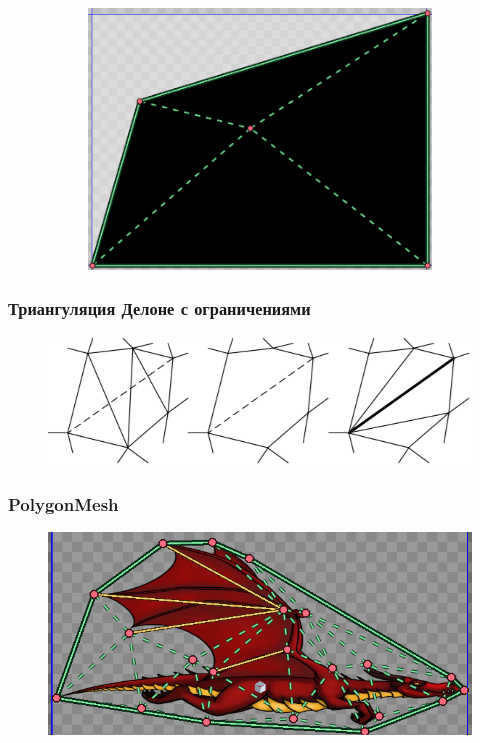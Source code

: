 \documentclass[10pt, unicode]{beamer}
\begin{document}
\begin{frame}
\begin{figure}[H]
\begin{subfigure}{0.49\linewidth}
                \centering
                \includegraphics[scale=0.225]{DeleteBoundary3.png}
            \end{subfigure}
        \end{figure}
    \end{frame}
    \begin{frame}
        \frametitle{Триангуляция Делоне с ограничениями}
        \begin{figure}[H]
            \centering
            \includegraphics[width=\linewidth, keepaspectratio]{DestroyAndBuild.png}
        \end{figure}
    \end{frame}
    \begin{frame}
        \frametitle{PolygonMesh}
        \begin{figure}[H]
            \centering
            \includegraphics[scale=0.8]{PGMW.png}
        \end{figure}
    \end{frame}
\end{document}
